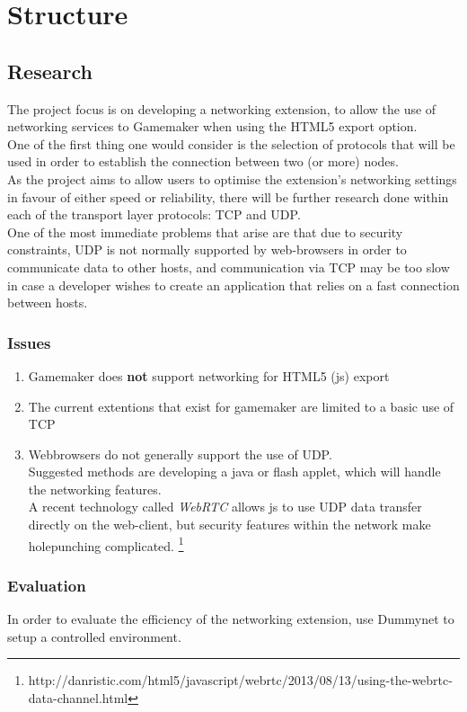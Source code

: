 \documentclass[12pt]{report}
\begin{document}
\section*{Structure}

\subsection*{Research}
The project focus is on developing a networking extension, to allow the use of networking services to Gamemaker when using the HTML5 export option.\\
One of the first thing one would consider is the selection of protocols that will be used in order to establish the connection between two (or more) nodes.\\
As the project aims to allow users to optimise the extension's networking settings in favour of either speed or reliability, there will be further research done within each of the transport layer protocols: TCP and UDP.\\
One of the most immediate problems that arise are that due to security constraints, UDP is not normally supported by web-browsers in order to communicate data to other hosts, and communication via TCP may be too slow in case a developer wishes to create an application that relies on a fast connection between hosts.

\subsubsection{Issues}
\begin{enumerate}
\item Gamemaker does \textbf{not} support networking for HTML5 (js) export
\item The current extentions that exist for gamemaker are limited to a basic use of TCP
\item Webbrowsers do not generally support the use of UDP.
\\Suggested methods are developing a java or flash applet, which will handle the networking features.
\\A recent technology called \emph{WebRTC} allows js to use UDP data transfer directly on the web-client, but security features  within the network make holepunching complicated. \footnote{http://danristic.com/html5/javascript/webrtc/2013/08/13/using-the-webrtc-data-channel.html} 
\end{enumerate} 

\subsubsection{Evaluation}
In order to evaluate the efficiency of the networking extension, use Dummynet to setup a controlled environment.
\end{document}
